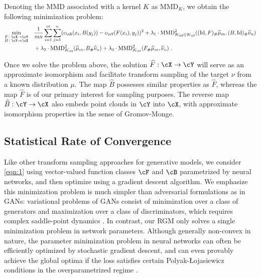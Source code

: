 \documentclass[11pt]{article}
\begin{document}
Denoting the MMD associated with a kernel $K$ as $\mathrm{MMD}_{K}$, we obtain the following minimization problem:
\begin{equation}
	\label{eqn:1}
	\begin{split}
		\min_{\substack{F \colon \cX \to \cY \\ B \colon \cY \to \cX}} \quad & \frac{1}{m n} \sum_{i = 1}^{m} \sum_{j = 1}^{n} (c_{\cX}(x_i, B(y_j)) - c_{\cY}(F(x_i), y_j))^2  + \lambda_1 \cdot \mathrm{MMD}_{K_{\cX} \otimes K_{\cY}}^2((\mathrm{Id}, F)_{\#} \widehat{\mu}_m, (B, \mathrm{Id})_{\#} \widehat{\nu}_n)\\
		& + \lambda_2 \cdot \mathrm{MMD}_{K_{\cX}}^2(\widehat{\mu}_m, B_{\#} \widehat{\nu}_n) + \lambda_3 \cdot \mathrm{MMD}_{K_{\cY}}^2(F_{\#} \widehat{\mu}_m, \widehat{\nu}_n) \;.
	\end{split}
\end{equation}

Once we solve the problem above, the solution $\widehat{F}:\cX\to\cY$ will serve as an approximate isomorphism and facilitate transform sampling of the target $\nu$ from a known distribution $\mu$. The map $\widehat{B}$ possesses similar properties as $\widehat{F}$, whereas the map $\widehat{F}$ is of our primary interest for sampling purposes. The reverse map $\widehat{B}:\cY \rightarrow \cX$ also embeds point clouds in $\cY$ into $\cX$, with approximate isomorphism properties in the sense of Gromov-Monge.

\subsection{Statistical Rate of Convergence}


Like other transform sampling approaches for generative models, we consider \eqref{eqn:1} using vector-valued function classes $\cF$ and $\cB$ parametrized by neural networks, and then optimize using a gradient descent algorithm. We emphasize this minimization problem is much simpler than adversarial formulations as in GANs: variational problems of GANs consist of minimization over a class of generators and maximization over a class of discriminators, which requires complex saddle-point dynamics \citep{daskalakis2017training, liang2018interaction}. In contrast, our RGM only solves a single minimization problem in network parameters. Although generally non-convex in nature, the parameter minimization problem in neural networks can often be efficiently optimized by stochastic gradient descent, and can even provably achieve the global optima if the loss satisfies certain Polyak-\L ojasiewicz conditions in the overparametrized regime \citep{bassily_belkin_ma_2018}.
\end{document}
